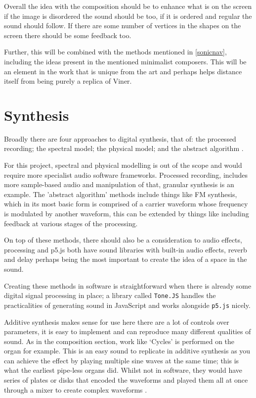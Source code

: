 Overall the idea with the composition should be to enhance what is on the
screen if the image is disordered the sound should be too, if it is ordered
and regular the sound should follow. If there are some number of vertices in the
shapes on the screen there should be some feedback too.

Further, this will be combined with the methods mentioned in
\autoref{sonicnav}, including the ideas present in the mentioned minimalist
composers. This will be an element in the work that is unique from the art and
perhaps helps distance itself from being purely a replica of Viner.

\section{Synthesis}
Broadly there are four approaches to digital synthesis, that of: the processed
recording; the spectral model; the physical model; and the abstract algorithm
\citep{smith_2005}.

For this project, spectral and physical modelling is out of the scope and would
require more specialist audio software frameworks. Processed recording, includes
more sample-based audio and manipulation of that, granular synthesis is an
example. The 'abstract algorithm' methods include things like FM synthesis,
which in its most basic form is comprised of a carrier waveform whose frequency
is modulated by another waveform, this can be extended by things like including
feedback at various stages of the processing.

On top of these methods, there should also be a consideration to audio effects,
processing and p5.js both have sound libraries with built-in audio effects,
reverb and delay perhaps being the most important to create the idea of a space
in the sound.

Creating these methods in software is straightforward when there is already
some digital signal processing in place; a library called \verb|Tone.JS| handles
the practicalities of generating sound in JavaScript and works alongside
\verb|p5.js| nicely.

Additive synthesis makes sense for use here there are a lot of controls over
parameters, it is easy to implement and can reproduce many different qualities
of sound.  As in the composition section, work like `Cycles' is performed on the
organ for example. This is an easy sound to replicate in additive synthesis as
you can achieve the effect by playing multiple sine waves at the same time; this
is what the earliest pipe-less organs did. Whilst not in software, they would
have series of plates or disks that encoded the waveforms and played them all at
once through a mixer to create complex waveforms \citep{10.2307/3680869}.

